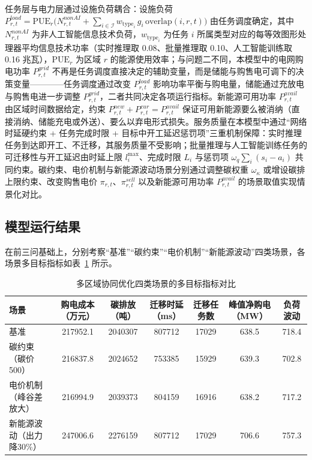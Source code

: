 \documentclass{ctexart}
\begin{document}
任务层与电力层通过设施负荷耦合：设施负荷 $P^{load}_{r,t}=\mathrm{PUE}_r\big(N^{nonAI}_{r,t}+\sum_{i\in\mathcal{I}}w_{\mathrm{type}_i}\,g_i\,\mathrm{overlap}(i,r,t)\big)$ 由任务调度确定，其中 $N^{nonAI}_{r,t}$ 为非人工智能信息技术负荷，$w_{\mathrm{type}_i}$ 为任务 $i$ 所属类型对应的每等效图形处理器平均信息技术功率（实时推理取 0.08、批量推理取 0.10、人工智能训练取 0.16 兆瓦），$\mathrm{PUE}_r$ 为区域 $r$ 的能源使用效率；与问题二不同，本模型中的电网购电功率 $P^{grid}_{r,t}$ 不再是任务调度直接决定的辅助变量，而是储能与购售电可调下的决策变量————任务调度通过改变 $P^{load}_{r,t}$ 影响功率平衡与购电量，储能通过充放电与购售电进一步调整 $P^{grid}_{r,t}$，二者共同决定各项运行指标。新能源可用功率 $P^{avail}_{r,t}$ 由区域时间数据给定，约束 $P^{new}_{r,t}+P^{cur}_{r,t}=P^{avail}_{r,t}$ 保证可用新能源要么被消纳（直接消纳、储能充电或外送）、要么以弃电形式损失。服务质量在本模型中通过“网络时延硬约束 + 任务完成时限 + 目标中开工延迟惩罚项”三重机制保障：实时推理任务到达即开工、不迁移，其服务质量不受影响；批量推理与人工智能训练任务的可迁移性与开工延迟由时延上限 $l_i^{\max}$、完成时限 $L_i$ 与惩罚项 $\omega_q\sum_i(s_i-a_i)$ 共同约束。碳约束、电价机制与新能源波动场景分别通过调整碳权重 $\omega_\kappa$ 或增设碳排上限约束、改变购售电价 $\pi_{r,t}$、$\pi^{sell}_{r,t}$ 以及新能源可用功率 $P^{avail}_{r,t}$ 的场景取值实现情景化对比。

\subsection{模型运行结果}

在前三问基础上，分别考察“基准”“碳约束”“电价机制”“新能源波动”四类场景，各场景多目标指标如表~\ref{tab:scenario} 所示。

\begin{table}[H]
	\centering
	\caption{多区域协同优化四类场景的多目标指标对比}
	\label{tab:scenario}
	\small
	\setlength{\tabcolsep}{3pt}
	\begin{tabular}{lcccccc}
		\toprule
		场景 & 购电成本（万元） & 碳排放（吨） & 迁移时延（ms） & 迁移任务数 & 峰值净购电（MW） & 负荷波动 \\
		\midrule
		基准 & 217952.1 & 2040307 & 807712 & 17029 & 638.5 & 718.4 \\
		碳约束（碳价500） & 216837.8 & 2024652 & 753385 & 15929 & 639.3 & 702.8 \\
		电价机制（峰谷差放大） & 216994.9 & 2039373 & 804159 & 16916 & 638.2 & 717.2 \\
		新能源波动（出力降30\%） & 247006.6 & 2276159 & 807712 & 17029 & 706.6 & 757.3 \\
		\bottomrule
	\end{tabular}
\end{table}
\end{document}
